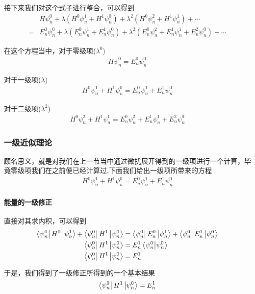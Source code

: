 \documentclass{article}
\begin{document}
接下来我们对这个式子进行整合，可以得到
\begin{align*}
	  & H\psi_n^0+\lambda\left(H^0\psi_n^1+H^1\psi_n^0\right)+\lambda^2\left(H^0\psi_n^2+H^1\psi_n^1\right)+\cdots                           \\
	= & E_n^0\psi_n^0+\lambda\left(E_n^0\psi_n^1+E_n^1\psi_n^0\right)+\lambda^2\left(E_n^0\psi_n^2+E_n^1\psi_n^1+E_n^2\psi_n^0\right)+\cdots
\end{align*}

在这个方程当中，对于零级项($\lambda^0$)
\begin{align*}
	H\psi_n^0=E_n^0\psi_n^0
\end{align*}

对于一级项($\lambda$)
\begin{align*}
	H^0\psi_n^1+H^1\psi_n^0=E_n^0\psi_n^1+E_n^1\psi_n^0
\end{align*}

对于二级项($\lambda^2$)
\begin{align*}
	H^0\psi_n^2+H^1\psi_n^1=E_n^0\psi_n^2+E_n^1\psi_n^1+E_n^2\psi_n^0
\end{align*}

\subsubsection{一级近似理论}
顾名思义，就是对我们在上一节当中通过微扰展开得到的一级项进行一个计算，毕竟零级项我们在之前便已经计算过,下面我们给出一级项所带来的方程
\begin{align*}
	H^0\psi_n^1+H^1\psi_n^0=E_n^0\psi_n^1+E_n^1\psi_n^0
\end{align*}

\paragraph{能量的一级修正}直接对其求内积，可以得到
\begin{align*}
	\bra{\psi_n^0}H^0\ket{\psi_n^1}+\bra{\psi_n^0}H^1\ket{\psi_n^0} & =\bra{\psi_n^0}E_n^0\ket{\psi_n^1}+\bra{\psi_n^0}E_n^1\ket{\psi_n^0} \\
	\bra{\psi_n^0}H^1\ket{\psi_n^0}                                 & =E_n^1\braket{\psi_n^0}{\psi_n^0}                                    \\
	\bra{\psi_n^0}H^1\ket{\psi_n^0}                                 & =E_n^1
\end{align*}

于是，我们得到了一级修正所得到的一个基本结果
\begin{equation*}
	\bra{\psi_n^0}H^1\ket{\psi_n^0}=E_n^1
\end{equation*}
\end{document}
